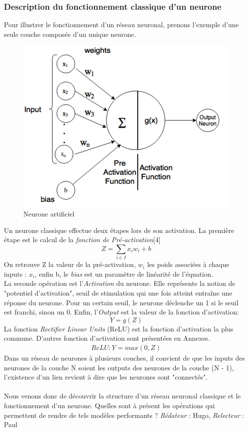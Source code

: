 \documentclass[oneside,a4paper,13pt]{article}
\begin{document}
\subsubsection{Description du fonctionnement classique d'un neurone}
Pour illustrer le fonctionnement d'un réseau neuronal, prenons l'exemple d'une seule couche composée d'un unique neurone.
\begin{figure}[H]
    \centering
    \includegraphics[scale=0.5]{Images/neron.png}
    \caption{Neurone artificiel}
    \label{fig:neuron}
\end{figure}
Un neurone classique effectue deux étapes lors de son activation. La première étape est le calcul de la \emph {fonction de Pré-activation}[4]
\begin{equation}
Z = \sum_{i \in I} x_{i}w_{i} + b
\end{equation}
On retrouve Z la valeur de la pré-activation, $w_{i}$ les poids associées à chaque inputs : $x_{i}$, enfin b, le \emph{bias} est un paramètre de linéarité de l'équation.\\
La seconde opération est l'\emph {Activation} du neurone. Elle représente la notion de "potentiel d'activation", seuil de stimulation qui une fois atteint entraîne une réponse du neurone. Pour un certain seuil, le neurone déclenche un 1 si le seuil est franchi, sinon un 0. Enfin, l'\emph {Output} est la valeur de la fonction d'activation:
\begin{equation}
Y = g(Z)
\end{equation}
La fonction \emph{Rectifier Linear Units} (ReLU) est la fonction d'activation la plus commune. D'autres fonction d'activation sont présentées en Annexes.
\begin{align*}
ReLU : Y = max(0,Z)
\end{align*}
Dans un réseau de neurones à plusieurs couches, il convient de que les inputs des neurones de la couche N soient les outputs des neurones de la couche (N - 1), l'existence d'un lien revient à dire que les neurones sont "connectés".\\ \\
Nous venons donc de découvrir la structure d'un réseau neuronal classique et le fonctionnement d'un neurone. Quelles sont à présent les opérations qui permettent de rendre de tels modèles performants ?
\smallbreak\textit{Rédateur} : Hugo, \textit{Relecteur} : Paul
\end{document}
